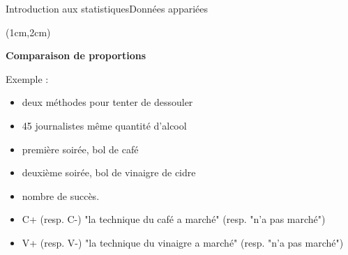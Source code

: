 \documentclass{beamer}
\begin{document}
\begin{frame}{Introduction aux statistiques}{Données appariées}
\begin{textblock*}{\textwidth}(1cm,2cm)

\begin{center}{\bf \Large Comparaison de proportions } \end{center}


 Exemple :
 
 \begin{itemize}
\item deux méthodes pour tenter de dessouler
\item 45 journalistes  même quantité d'alcool 
\item  première soirée, bol de café
\item deuxième soirée,  bol de vinaigre de cidre
\item  nombre de succès.
\item  C+ (resp. C-)  "la technique du café a marché" (resp. "n'a pas marché") 
\item  V+ (resp. V-)  "la technique du vinaigre a marché" (resp. "n'a pas marché")
 \end{itemize}




\end{textblock*}

\end{frame}

 
\end{document}
